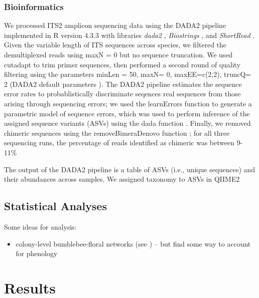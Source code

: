 \documentclass[12pt]{article}
\begin{document}
\subsubsection{Bioinformatics}
We processed ITS2 amplicon sequencing data using the DADA2 pipeline \parencite{callahanDADA2HighresolutionSample2016,callahanDADA2ITSPipeline} implemented in R version 4.3.3 \parencite{rcoreteamLanguageEnvironmentStatistical2021a} with libraries \emph{dada2} \parencite{callahanDADA2HighresolutionSample2016}, \emph{Biostrings} \parencite{pagesBiostringsEfficientString2026}, and \emph{ShortRead} \parencite{morganShortReadBioconductorPackage2009}. Given the variable length of ITS sequences across species, we filtered the demultiplexed reads using maxN = 0 but no sequence truncation. We used cutadapt \parencite{martinCutadaptRemovesAdapter2011} to trim primer sequences, then performed a second round of quality filtering using the parameters minLen = 50, maxN= 0, maxEE=c(2,2), truncQ= 2 (DADA2 default parameters \parencite{callahanDADA2ITSPipeline}). The DADA2 pipeline estimates the sequence error rates to probablistically discriminate seqences real sequences from those arising through sequencing errors; we used the learnErrors function to generate a parametric model of sequence errors, which was used to perform inference of the assigned sequence variants (ASVs) using the dada function \parencite{callahanDADA2HighresolutionSample2016}. Finally, we removed chimeric sequences using the removeBimeraDenovo function \parencite{callahanDADA2HighresolutionSample2016}; for all three sequencing runs, the percentage of reads identified as chimeric was between 9-11\%

The output of the DADA2 pipeline is a table of ASVs (i.e., unique sequences) and their abundances across samples. We assigned taxonomy to ASVs in QIIME2 \parencite{bolyenReproducibleInteractiveScalable2019}


\subsection{Statistical Analyses}
Some ideas for analysis:
\begin{itemize}
  \item colony-level bumblebee-floral networks (see \parencite{yeFloralResourcePartitioning2024a}) -- but find some way to account for phenology
\end{itemize}

\section{Results}
\end{document}
